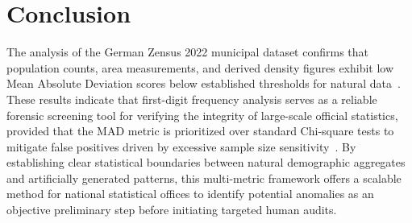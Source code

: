 \documentclass[11pt,a4paper]{article}
\begin{document}
\section{Conclusion}
The analysis of the German Zensus 2022 municipal dataset confirms that population counts, area measurements, and derived density figures exhibit low Mean Absolute Deviation scores below established thresholds for natural data~\cite{Kossler2024SomeNI}. These results indicate that first-digit frequency analysis serves as a reliable forensic screening tool for verifying the integrity of large-scale official statistics, provided that the MAD metric is prioritized over standard Chi-square tests to mitigate false positives driven by excessive sample size sensitivity~\cite{Kossovsky2021OnTM}. By establishing clear statistical boundaries between natural demographic aggregates and artificially generated patterns, this multi-metric framework offers a scalable method for national statistical offices to identify potential anomalies as an objective preliminary step before initiating targeted human audits.



\printbibliography
\end{document}
